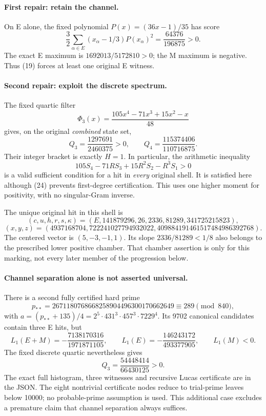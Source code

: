 \paragraph{First repair: retain the channel.}
On E alone, the fixed polynomial $P(x)=(36x-1)/35$ has score
\[
 \boxed{\frac32\sum_{\alpha\in E}(x_\alpha-1/3)P(x_\alpha)^2
 =\frac{64376}{196875}>0.}\tag{25}
\]
The exact E maximum is $1692013/5172810>0$; the M maximum is negative.
Thus (19) forces at least one original E witness.

\paragraph{Second repair: exploit the discrete spectrum.}
The fixed quartic filter
\[
 \Phi_3(x)=\frac{105x^4-71x^3+15x^2-x}{48}
\]
gives, on the original \emph{combined} state set,
\[
 \boxed{Q_3=\frac{1297691}{2460375}>0,
 \qquad Q_4=\frac{115374406}{110716875}.}\tag{26}
\]
Their integer bracket is exactly $H=1$. In particular, the arithmetic
inequality
\[
 \boxed{105S_4-71RS_3+15R^2S_2-R^3S_1>0}\tag{27}
\]
is a valid sufficient condition for a hit in \emph{every} original shell.
It is satisfied here although (24) prevents first-degree certification.
This uses one higher moment for positivity, with no singular-Gram inverse.

The unique original hit in this shell is
\[
 (c,u,h,r,s,\kappa)=
 (E,141879296,26,2336,81289,341725215823),
\]
\[
 (x,y,z)=
 (4937168704,722241027794932022,409884191461517484986392768).
 \tag{28}
\]
The centered vector is $(5,-3,-1,1)$. Its slope $2336/81289<1/8$ also belongs
to the prescribed lower positive chamber. That chamber assertion is only for
this marking, not every later member of the progression below.

\paragraph{Channel separation alone is not asserted universal.}
There is a second fully certified hard prime
\[
 p_{**}=2671180768668258904496300170662649\equiv289\pmod{840},
\]
with $a=(p_{**}+135)/4=2^5\cdot431^3\cdot457^3\cdot7229^4$.
Its 9702 canonical candidates contain three E hits, but
\[
 L_1(E+M)=-\frac{7138170316}{1971871105},\qquad
 L_1(E)=-\frac{146243172}{493377905},\qquad L_1(M)<0.
\]
The fixed discrete quartic nevertheless gives
\[
 Q_3=\frac{54448414}{66430125}>0.
\]
The exact full histogram, three witnesses and recursive Lucas certificate
are in the JSON. The eight nontrivial certificate nodes reduce to trial-prime
leaves below 10000; no probable-prime assumption is used. This additional case
excludes a premature claim that channel separation always suffices.

